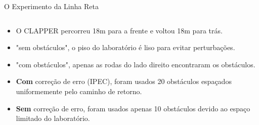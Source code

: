 \documentclass[xcolor=dvipsnames, aspectratio=169]{beamer}
\begin{document}
\begin{frame}{O Experimento da Linha Reta}
\begin{columns}
    \begin{column}{0.5\textwidth}
      \begin{itemize}
        \item O CLAPPER percorreu 18m para a frente e voltou 18m para trás.
        \item "sem obstáculos", o piso do laboratório é liso para evitar perturbações.
        \item "com obstáculos", apenas as rodas do lado direito encontraram os obstáculos.
        \item \textbf{Com} correção de erro (IPEC), foram usados 20 obstáculos espaçados uniformemente pelo caminho de retorno.
        \item \textbf{Sem} correção de erro, foram usados apenas 10 obstáculos devido ao espaço limitado do laboratório.
      \end{itemize}      
    \end{column}
  \end{columns}
\end{frame}
\end{document}
